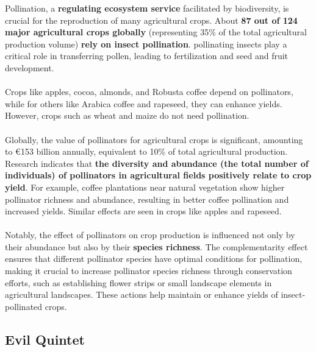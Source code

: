 \documentclass[../summary.tex]{subfiles}
\begin{document}
Pollination, a \textbf{regulating ecosystem service} facilitated by biodiversity, is crucial for the reproduction of many agricultural crops. About \textbf{87 out of 124 major agricultural crops globally} (representing 35\% of the total agricultural production volume) \textbf{rely on insect pollination}. pollinating insects play a critical role in transferring pollen, leading to fertilization and seed and fruit development.\\
\\
Crops like apples, cocoa, almonds, and Robusta coffee depend on pollinators, while for others like Arabica coffee and rapeseed, they can enhance yields. However, crops such as wheat and maize do not need pollination.\\
\\
Globally, the value of pollinators for agricultural crops is significant, amounting to €153 billion annually, equivalent to 10\% of total agricultural production. Research indicates that \textbf{the diversity and abundance (the total number of individuals) of pollinators in agricultural fields positively relate to crop yield}. For example, coffee plantations near natural vegetation show higher pollinator richness and abundance, resulting in better coffee pollination and increased yields. Similar effects are seen in crops like apples and rapeseed.\\
\\
Notably, the effect of pollinators on crop production is influenced not only by their abundance but also by their \textbf{species richness}. The complementarity effect ensures that different pollinator species have optimal conditions for pollination, making it crucial to increase pollinator species richness through conservation efforts, such as establishing flower strips or small landscape elements in agricultural landscapes. These actions help maintain or enhance yields of insect-pollinated crops.

\subsection{Evil Quintet}
\end{document}

